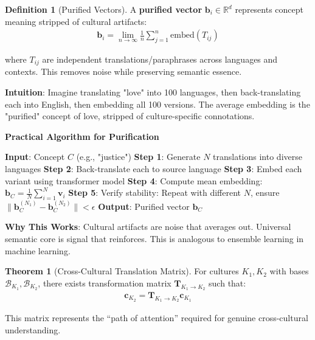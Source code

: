 \documentclass[11pt,a4paper]{article}
\theoremstyle{definition}
\newtheorem{definition}{Definition}[section]
\newtheorem{theorem}{Theorem}[section]
\theoremstyle{remark}
\newcommand{\RR}{\mathbb{R}}
\newcommand{\bb}{\mathbf{b}}
\newcommand{\cc}{\mathbf{c}}
\newcommand{\TT}{\mathbf{T}}
\begin{document}
\begin{definition}[Purified Vectors]
A \textbf{purified vector} \(\bb_i \in \RR^d\) represents concept meaning stripped of cultural artifacts:
\begin{align}
\bb_i = \lim_{n \rightarrow \infty} \frac{1}{n} \sum_{j=1}^n \text{embed}(T_{ij})
\end{align}

where \(T_{ij}\) are independent translations/paraphrases across languages and contexts. This removes noise while preserving semantic essence.

\textbf{Intuition}: Imagine translating "love" into 100 languages, then back-translating each into English, then embedding all 100 versions. The average embedding is the "purified" concept of love, stripped of culture-specific connotations.
\end{definition}

\begin{mdframed}[backgroundcolor=green!10,linewidth=2pt]
\textbf{Practical Algorithm for Purification}

\begin{algorithmic}[1]
\State \textbf{Input}: Concept \(C\) (e.g., "justice")
\State \textbf{Step 1}: Generate \(N\) translations into diverse languages
\State \textbf{Step 2}: Back-translate each to source language
\State \textbf{Step 3}: Embed each variant using transformer model
\State \textbf{Step 4}: Compute mean embedding: \(\bb_C = \frac{1}{N} \sum_{i=1}^N \mathbf{v}_i\)
\State \textbf{Step 5}: Verify stability: Repeat with different \(N\), ensure \(\|\bb_C^{(N_1)} - \bb_C^{(N_2)}\| < \epsilon\)
\State \textbf{Output}: Purified vector \(\bb_C\)
\end{algorithmic}

\textbf{Why This Works}: Cultural artifacts are noise that averages out. Universal semantic core is signal that reinforces. This is analogous to ensemble learning in machine learning.
\end{mdframed}

\begin{theorem}[Cross-Cultural Translation Matrix]
For cultures \(K_1, K_2\) with bases \(\mathcal{B}_{K_1}, \mathcal{B}_{K_2}\), there exists transformation matrix \(\TT_{K_1 \to K_2}\) such that:
\begin{align}
\cc_{K_2} = \TT_{K_1 \to K_2} \cc_{K_1}
\end{align}

This matrix represents the ``path of attention'' required for genuine cross-cultural understanding.
\end{theorem}
\end{document}
